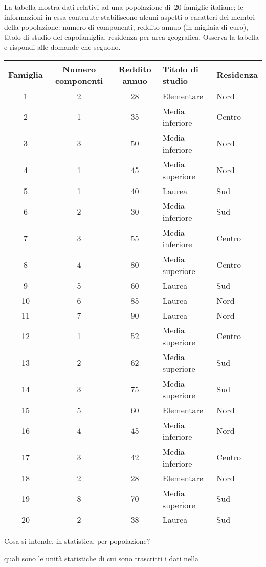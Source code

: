 \begin{esercizio}
\label{ese:A.9}
La tabella mostra dati relativi ad una popolazione di~20 famiglie italiane; 
le informazioni in essa contenute stabiliscono alcuni aspetti o caratteri
dei membri della popolazione: numero di componenti, reddito annuo (in 
migliaia di euro), titolo di studio del capofamiglia, residenza per area 
geografica.
Osserva la tabella e rispondi alle domande che seguono.
\begin{center}
 \begin{tabular}{cccll}
\toprule
Famiglia & Numero componenti & Reddito annuo & Titolo di studio & 
Residenza\\
\midrule
1 & 2 & 28 & Elementare & Nord \\
2 & 1 & 35 & Media inferiore & Centro \\
3 & 3 & 50 & Media inferiore & Nord \\
4 & 1 & 45 & Media superiore & Nord \\
5 & 1 & 40 & Laurea & Sud \\
6 & 2 & 30 & Media inferiore & Sud \\
7 & 3 & 55 & Media inferiore & Centro \\
8 & 4 & 80 & Media superiore & Centro \\
9 & 5 & 60 & Laurea & Sud \\
10 & 6 & 85 & Laurea & Nord \\
11 & 7 & 90 & Laurea & Nord \\
12 & 1 & 52 & Media superiore & Centro \\
13 & 2 & 62 & Media superiore & Sud \\
14 & 3 & 75 & Media superiore & Sud \\
15 & 5 & 60 & Elementare & Nord\\
16 & 4 & 45 & Media inferiore & Nord \\
17 & 3 & 42 & Media inferiore & Centro \\
18 & 2 & 28 & Elementare & Nord \\
19 & 8 & 70 & Media superiore & Sud \\
20 & 2 & 38 & Laurea & Sud \\
\bottomrule
\end{tabular}
\end{center}
\begin{itemize*}
\item Cosa si intende, in statistica, per popolazione?
\item quali sono le unità statistiche di cui sono trascritti i dati nella 

\end{itemize*}
\end{esercizio}
